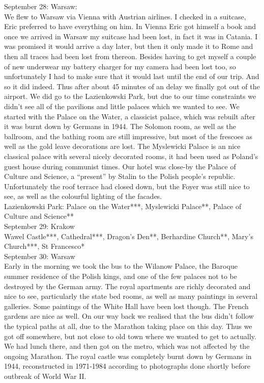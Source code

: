 September 28: Warsaw:\\
We flew to Warsaw via Vienna with Austrian airlines. I checked in a suitcase, Eric preferred to have everything on him. In Vienna Eric got himself a book and once we arrived in Warsaw my suitcase had been lost, in fact it was in Catania. I was promised it would arrive a day later, but then it only made it to Rome and then all traces had been lost from thereon. Besides having to get myself a couple of new underwear my battery charger for my camera had been lost too, so unfortunately I had to make sure that it would last until the end of our trip. And so it did indeed. Thus after about 45 minutes of an delay we finally got out of the airport. We did go to the Lazienkowski Park, but due to our time constraints we didn't see all of the pavilions and little palaces which we wanted to see. We started with the Palace on the Water, a classicist palace, which was rebuilt after it was burnt down by Germans in 1944. The Solomon room, as well as the ballroom, and the bathing room are still impressive, but most of the frescoes as well as the gold leave decorations are lost. The Myslewicki Palace is an nice classical palace with several nicely decorated rooms, it had been used as Poland's guest house during communist times. Our hotel was close-by the Palace of Culture and Science, a ``present'' by Stalin to the Polish people's republic. Unfortunately the roof terrace had closed down, but the Foyer was still nice to see, as well as the colourful lighting of the facades.\\

Lazienkowski Park: Palace on the Water***, Myslewicki Palace**, Palace of Culture and Science**\\

September 29: Krakow\\
Wawel Castle***, Cathedral***, Dragon's Den**, Berhardine Church**, Mary's Church***, St Francesco*\\

September 30: Warsaw\\
Early in the morning we took the bus to the Wilanow Palace, the Baroque summer residence of the Polish kings, and one of the few palaces not to be destroyed by the German army. The royal apartments are richly decorated and nice to see, particularly the state bed rooms, as well as many paintings in several galleries. Some paintings of the White Hall have been lost though. The French gardens are nice as well. On our way back we realised that the bus didn't follow the typical paths at all, due to the Marathon taking place on this day. Thus we got off somewhere, but not close to old town where we wanted to get to actually. We had lunch there, and then got on the metro, which was not affected by the ongoing Marathon. The royal castle was completely burnt down by Germans in 1944, reconstructed in 1971-1984 according to photographs done shortly before outbreak of World War II.\\ 

